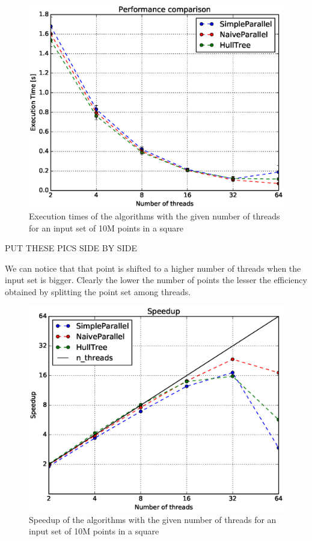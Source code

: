 \documentclass[letterpaper]{article}
\begin{document}
\begin{figure}[!ht]\centering
  \includegraphics[scale=0.33]{./plots/xeon_square_10000000.eps}
  \caption{Execution times of the algorithms with the given number of threads for an input set of 10M points in a square\label{Threads time}}
\end{figure}

PUT THESE PICS SIDE BY SIDE

We can notice that that point is shifted to a higher number of threads when the input set is bigger. Clearly the lower the number of points the lesser the efficiency obtained by splitting the point set among threads.

\begin{figure}[!ht]\centering
  \includegraphics[scale=0.33]{./plots/speedup_xeon_square_10000000.eps}
  \caption{Speedup of the algorithms with the given number of threads for an input set of 10M points in a square\label{Threads time}}
\end{figure}
\end{document}
